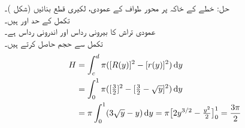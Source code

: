 حل:\quad
{}\quad
خطے کے خاکہ پر محور طواف  کے عمودی، لکیری قطع بنائیں (شکل )۔\\
\quad
تکمل کے حد  اور  ہیں۔\\
\quad
عمودی تراش کا بیرونی رداس  اور اندرونی رداس  ہے۔\\
\quad
تکمل سے حجم حاصل کرتے ہیں۔
\begin{align*}
H&=\int_c^d\pi([R(y)]^2-[r(y)]^2)\dif y\\
&=\int_0^1\pi([\tfrac{3}{2}]^2-[\tfrac{3}{2}-\sqrt{y}]^2)\dif y\\
&=\pi\int_0^1(3\sqrt{y}-y)\dif y=\pi\big[2y^{3/2}-\tfrac{y^2}{2}\big]_0^1=\frac{3\pi}{2}
\end{align*}
